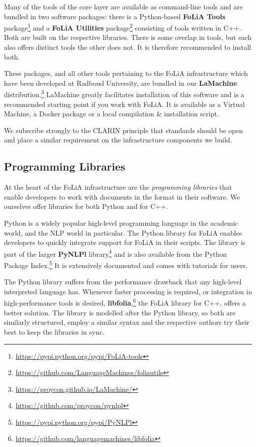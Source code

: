 \documentclass[a4paper,11pt]{article}
\begin{document}
Many of the tools of the core layer are available as command-line tools and are
bundled in two software packages: there is a Python-based \textbf{FoLiA Tools}
package\footnote{\url{https://pypi.python.org/pypi/FoLiA-tools}} and a \textbf{FoLiA
Utilities} package\footnote{\url{https://github.com/LanguageMachines/foliautils}}
consisting of tools written in C++. Both are built on the respective libraries.
There is some overlap in tools, but each also offers distinct tools the other
does not. It is therefore recommended to install both.

These packages, and all other tools pertaining to the FoLiA infrastructure
which have been developed at Radboud University, are bundled in our
\textbf{LaMachine}
distribution.\footnote{\url{https://proycon.github.io/LaMachine/}} LaMachine
greatly facilitates installation of this software and is a recommended starting
point if you work with FoLiA. It is available as a Virtual Machine, a Docker
package or a local compilation \& installation script.

We subscribe strongly to the CLARIN principle that standards should be open and
place a similar requirement on the infrastructure components we build.

\subsection{Programming Libraries}

At the heart of the FoLiA infrastructure are the \emph{programming libraries} that
enable developers to work with documents in the format in their software. We
ourselves offer libraries for both Python and for C++.

Python is a widely popular high-level programming language in the academic
world, and the NLP world in particular.  The Python library for FoLiA enables
developers to quickly integrate support for FoLiA in their scripts. The library
is part of the larger \textbf{PyNLPl}
library\footnote{\url{https://github.com/proycon/pynlpl}} and is also available from the
Python Package Index.\footnote{\url{https://pypi.python.org/pypi/PyNLPl}} It is extensively documented and comes with tutorials for
users.

The Python library suffers from the performance drawback that any high-level
interpreted language has. Whenever faster processing is required, or
integration in high-performance tools is desired,
\textbf{libfolia},\footnote{\url{https://github.com/languagemachines/libfolia}} the
FoLiA library for C++, offers a better solution. The library is modelled after
the Python library, so both are similarly structured, employ a similar syntax
and the respective authors try their best to keep the libraries in sync.
\end{document}
